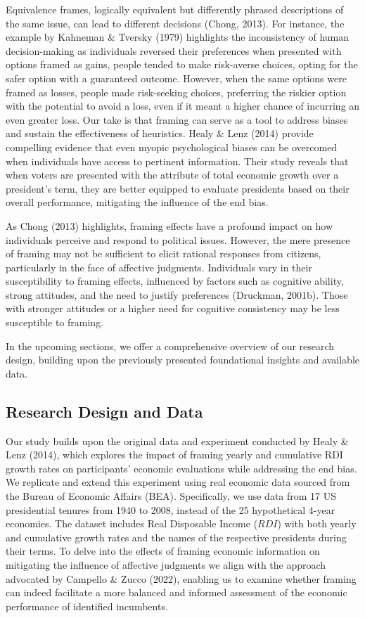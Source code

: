 \documentclass[
]{article}
\begin{document}
Equivalence frames, logically equivalent but differently phrased
descriptions of the same issue, can lead to different decisions (Chong,
2013). For instance, the example by Kahneman \& Tversky (1979)
highlights the inconsistency of human decision-making as individuals
reversed their preferences when presented with options framed as gains,
people tended to make risk-averse choices, opting for the safer option
with a guaranteed outcome. However, when the same options were framed as
losses, people made risk-seeking choices, preferring the riskier option
with the potential to avoid a loss, even if it meant a higher chance of
incurring an even greater loss. Our take is that framing can serve as a
tool to address biases and sustain the effectiveness of heuristics.
Healy \& Lenz (2014) provide compelling evidence that even myopic
psychological biases can be overcomed when individuals have access to
pertinent information. Their study reveals that when voters are
presented with the attribute of total economic growth over a president's
term, they are better equipped to evaluate presidents based on their
overall performance, mitigating the influence of the end bias.

As Chong (2013) highlights, framing effects have a profound impact on
how individuals perceive and respond to political issues. However, the
mere presence of framing may not be sufficient to elicit rational
responses from citizens, particularly in the face of affective
judgments. Individuals vary in their susceptibility to framing effects,
influenced by factors such as cognitive ability, strong attitudes, and
the need to justify preferences (Druckman, 2001b). Those with stronger
attitudes or a higher need for cognitive consistency may be less
susceptible to framing.

In the upcoming sections, we offer a comprehensive overview of our
research design, building upon the previously presented foundational
insights and available data.

\hypertarget{research-design-and-data}{%
\subsection{Research Design and Data}\label{research-design-and-data}}

Our study builds upon the original data and experiment conducted by
Healy \& Lenz (2014), which explores the impact of framing yearly and
cumulative RDI growth rates on participants' economic evaluations while
addressing the end bias. We replicate and extend this experiment using
real economic data sourced from the Bureau of Economic Affairs (BEA).
Specifically, we use data from 17 US presidential tenures from 1940 to
2008, instead of the 25 hypothetical 4-year economies. The dataset
includes Real Disposable Income (\(RDI\)) with both yearly and
cumulative growth rates and the names of the respective presidents
during their terms. To delve into the effects of framing economic
information on mitigating the influence of affective judgments we align
with the approach advocated by Campello \& Zucco (2022), enabling us to
examine whether framing can indeed facilitate a more balanced and
informed assessment of the economic performance of identified
incumbents.
\end{document}
